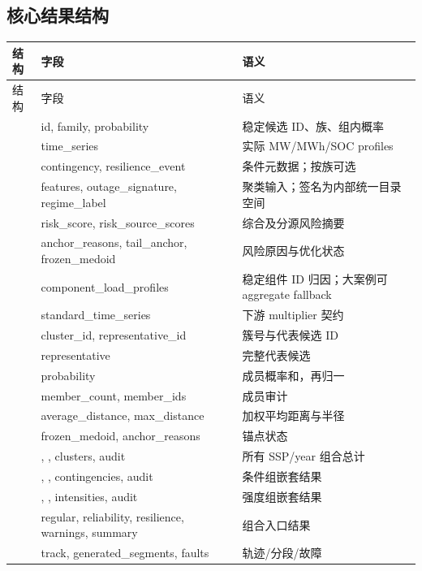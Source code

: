 \subsection{核心结果结构}
\begin{center}\footnotesize
\begin{longtable}{@{}L{4.8cm}L{4.4cm}L{5.0cm}@{}}
\toprule
结构 & 字段 & 语义\\
\midrule\endfirsthead
\toprule 结构 & 字段 & 语义\\\midrule\endhead
{} & id, family, probability & 稳定候选 ID、族、组内概率\\
 & time\_series & 实际 MW/MWh/SOC profiles\\
 & contingency, resilience\_event & 条件元数据；按族可选\\
 & features, outage\_signature, regime\_label & 聚类输入；签名为内部统一目录空间\\
 & risk\_score, risk\_source\_scores & 综合及分源风险摘要\\
 & anchor\_reasons, tail\_anchor, frozen\_medoid & 风险原因与优化状态\\
 & component\_load\_profiles & 稳定组件 ID 归因；大案例可 aggregate fallback\\
 & standard\_time\_series & 下游 multiplier 契约\\
\midrule
{} & cluster\_id, representative\_id & 簇号与代表候选 ID\\
 & representative & 完整代表候选\\
 & probability & 成员概率和，再归一\\
 & member\_count, member\_ids & 成员审计\\
 & average\_distance, max\_distance & 加权平均距离与半径\\
 & frozen\_medoid, anchor\_reasons & 锚点状态\\
\midrule
{} & , , clusters, audit & 所有 SSP/year 组合总计\\
 & , , contingencies, audit & 条件组嵌套结果\\
 & , , intensities, audit & 强度组嵌套结果\\
 & regular, reliability, resilience, warnings, summary & 组合入口结果\\
\midrule
{} & track, generated\_segments, faults & 轨迹/分段/故障\\

\end{longtable}
\end{center}
